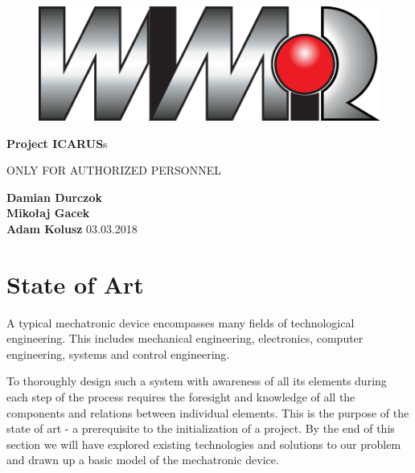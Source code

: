 \documentclass{article}
\begin{document}
\begin{titlepage}
\begin{center}
\begin{figure}
\begin{minipage}[b]{0.4\textwidth}
    	\end{minipage}
    	\hfill
    	\begin{minipage}[b]{0.4\textwidth}
	    	\centering
    		\includegraphics[width=\textwidth]{IMG/WIMIR.png}
		\end{minipage}
		\vspace{1cm}
    \end{figure}

    \Huge \textbf{Project ICARUS}s
        
    \vspace{0.8cm}
    \LARGE 
    \color{red} ONLY FOR AUTHORIZED PERSONNEL
    \color{black}
            
    \vspace{0.8cm}       
    \textbf{Damian Durczok\\Mikołaj Gacek\\Adam Kolusz}        
    \vfill       
    \vspace{0.8cm}    
    03.03.2018
        
    \end{center}
\end{titlepage}

\tableofcontents
\break

\section{State of Art}
A typical mechatronic device encompasses many fields of technological engineering. This includes mechanical engineering, electronics, computer engineering, systems and control engineering. 

To thoroughly design such a system with awareness of all its elements during each step of the process requires the foresight and knowledge of all the components and relations between individual elements. This is the purpose of the state of art - a prerequisite to the initialization of a project. By the end of this section we will have explored existing technologies and solutions to our problem and drawn up a basic model of the mechatronic device.
\end{document}
